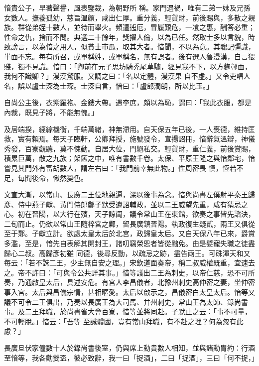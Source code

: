 \begin{pinyinscope}
 愔貴公子，早著聲譽，風表鑒裁，為朝野所
 稱。家門遇禍，唯有二弟一妹及兄孫女數人。撫養孤幼，慈旨溫顏，咸出仁厚。重分義，輕貨財，前後賜與，多散之親族。群從弟姪十數人，並待而舉火。頻遭迍厄，冒履艱危，一飡之惠，酬答必重；性命之仇，捨而不問。典選二十餘年，獎擢人倫，以為已任。然取士多以言貌，時致謗言，以為愔之用人，似貧士市瓜，取其大者。愔聞，不以為意。其聰記彊識，半面不忘。每有所召，或單稱姓，或單稱名，無有誤者。後有選人魯漫漢，自言猥賤，獨不見識。愔曰：「卿前在元子思坊騎禿尾草驢，經見我不下，以方麴鄣面，我何不識卿？」漫漢驚服。又調之曰：「名以定體，漫漢果
 自不虛。」又令吏唱人名，誤以盧士深為士琛。士深自言，愔曰：「盧郎潤朗，所以比玉。」



 自尚公主後，衣紫羅袍、金鏤大帶。遇李庶，頗以為恥，謂曰：「我此衣服，都是內裁，既見子將，不能無愧。」



 及居端揆，經綜機衡，千端萬緒，神無滯用。自天保五年已後，一人喪德，維持匡救，實有賴焉。每天子臨軒，公卿拜授，施號發令，宣揚詔冊，愔辭氣溫辯，神儀秀發，百寮觀聽，莫不悚動。自居大位，門絕私交。輕貨財，重仁義，前後賞賜，積累巨萬，散之九族；架篋之中，唯有書數千卷。太保、平原王隆之與愔鄰宅，愔嘗見其門外有富胡數人，謂左右曰：「我門前幸無此物。」性周密畏
 慎，恆若不足，每聞後命，愀然變色。



 文宣大漸，以常山、長廣二王位地親逼，深以後事為念。愔與尚書左僕射平秦王歸彥、侍中燕子獻、黃門侍郎鄭子默受遺詔輔政，並以二王威望先重，咸有猜忌之心。初在晉陽，以大行在殯，天子諒訚，議令常山王在東館，欲奏之事皆先諮決，二旬而止。仍欲以常山王隨梓宮之鄴，留長廣鎮晉陽。執政復生疑貳，兩王又俱從至于鄴。子獻立計。欲處太皇太后於北宮，政歸皇太后。又自天保八年已來，爵賞多濫，至是，愔先自表解其開封王，諸叨竊榮恩者皆從黜免。由是嬖寵失職之徒盡歸心二叔。高歸彥初雖
 同德，後尋反動，以疏忌之跡，盡告兩王。可硃渾天和又每云：「若不誅二王，少主無自安之理。」宋欽道面奏帝，稱二叔威權既重，宜速去之。帝不許曰：「可與令公共詳其事。」愔等議出二王為刺史，以帝仁慈，恐不可所奏，乃通啟皇太后，具述安危。有宮人李昌儀者，北豫州刺史高仲密之妻，坐仲密事入宮。太后與昌儀宗情，甚相暱愛。太后以啟示之，昌儀密白太皇太后。愔等又議不可令二王俱出，乃奏以長廣王為大司馬、并州刺史，常山王為太師、錄尚書事。及二王拜職，於尚書省大會百寮，愔等並將同赴。子默止之云：「事不可量，不可輕脫。」愔云：「吾等
 至誠體國，豈有常山拜職，有不赴之理？何為忽有此慮？」



 長廣旦伏家僮數十人於錄尚書後室，仍與席上勳貴數人相知，並與諸勳胄約：行酒至愔等，我各勸雙盃，彼必致辭，我一曰「捉酒」，二曰「捉酒」，三曰「何不捉，」




\end{pinyinscope}
